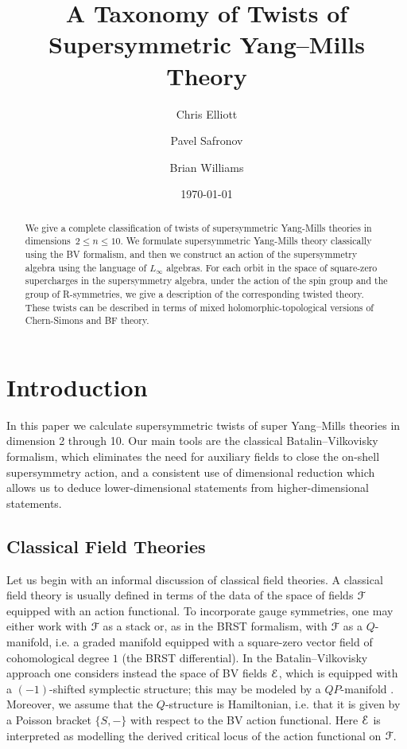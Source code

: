 \documentclass[10pt, oneside]{article}
\title{A Taxonomy of Twists of Supersymmetric Yang--Mills Theory}
\author{Chris Elliott\and Pavel Safronov \and Brian Williams}
\date{\today}
\begin{document}
\maketitle

\begin{abstract}
We give a complete classification of twists of supersymmetric Yang-Mills theories in dimensions~$2\leq n \leq 10$.
We formulate supersymmetric Yang-Mills theory classically using the BV formalism, and then we construct an action of the supersymmetry algebra using the language of $L_\infty$ algebras.  For each orbit in the space of square-zero supercharges in the supersymmetry algebra, under the action of the spin group and the group of R-symmetries, we give a description of the corresponding twisted theory.  These twists can be described in terms of mixed holomorphic-topological versions of Chern-Simons and BF theory. 
\end{abstract}

\pagestyle{intro}
\setcounter{tocdepth}{2}
\tableofcontents

\section*{Introduction} 
\label{sect:intro}

In this paper we calculate supersymmetric twists of super Yang--Mills theories in dimension 2 through 10. Our main tools are the classical Batalin--Vilkovisky formalism, which eliminates the need for auxiliary fields to close the on-shell supersymmetry action, and a consistent use of dimensional reduction which allows us to deduce lower-dimensional statements from higher-dimensional statements.

\subsection*{Classical Field Theories}

Let us begin with an informal discussion of classical field theories. A classical field theory is usually defined in terms of the data of the space of fields $\mathcal F$ equipped with an action functional. To incorporate gauge symmetries, one may either work with $\mathcal F$ as a stack or, as in the BRST formalism, with $\mathcal F$ as a $Q$-manifold, i.e. a graded manifold equipped with a square-zero vector field of cohomological degree $1$ (the BRST differential). In the Batalin--Vilkovisky \cite{BatalinVilkovisky} approach one considers instead the space of BV fields $\mathcal E$, which is equipped with a $(-1)$-shifted symplectic structure; this may be modeled by a $QP$-manifold \cite{Schwarz}. Moreover, we assume that the $Q$-structure is Hamiltonian, i.e. that it is given by a Poisson bracket $\{S, -\}$ with respect to the BV action functional. Here $\mathcal E$ is interpreted as modelling the derived critical locus of the action functional on $\mathcal F$.
\end{document}
